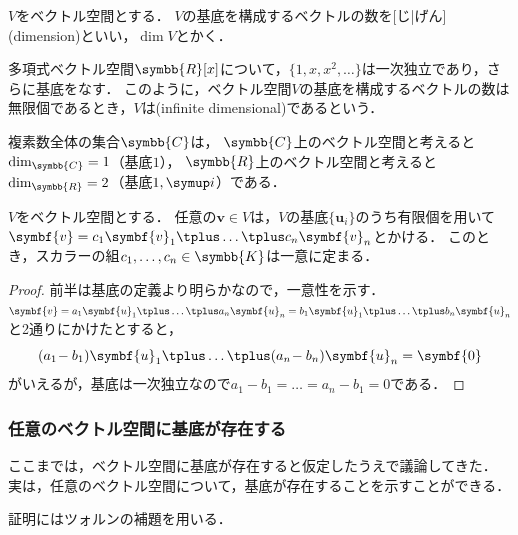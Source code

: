 \documentclass[../sotsu.tex]{subfiles}
\begin{document}
\begin{definition}[次元]
    \label{dfn:dimension}
    $V$をベクトル空間とする．
    $V$の基底を構成するベクトルの数を[じ|げん](dimension)といい，$\dim V$とかく．
\end{definition}

\begin{example}
    多項式ベクトル空間$\symbb{R}[x]$について，$\{ 1, x, x^2, \dotsc \}$は一次独立であり，さらに基底をなす．
    このように，ベクトル空間$V$の基底を構成するベクトルの数は無限個であるとき，$V$は(infinite dimensional)であるという．
\end{example}

\begin{example}
    複素数全体の集合$\symbb{C}$は，
    $\symbb{C}$上のベクトル空間と考えると$\dim_{\symbb{C}} = 1$（基底$1$），
    $\symbb{R}$上のベクトル空間と考えると$\dim_{\symbb{R}} = 2$（基底$1, \iu$）である．
\end{example}


\begin{corollary}[基底によるベクトルの展開]
    \label{thm:coordinates-by-basis}
    $V$をベクトル空間とする．
    任意の$\symbf{v} \in V$は，$V$の基底$ \{ \symbf{u}_i \} $のうち有限個を用いて$\symbf{v} = c_1 \symbf{v}_1 \vecplus \dots \vecplus c_n \symbf{v}_n$とかける．
    このとき，スカラーの組$c_1, \dots, c_n \in \symbb{K}$は一意に定まる．
\end{corollary}

\begin{proof}
    前半は基底の定義より明らかなので，一意性を示す．
    $\symbf{v} = a_1 \symbf{u}_1 \vecplus \dots \vecplus a_n \symbf{u}_n = b_1 \symbf{u}_1 \vecplus \dots \vecplus b_n \symbf{u}_n$と2通りにかけたとすると，
    \begin{equation*}
        (a_1 \! - b_1) \symbf{u}_1 \vecplus \dots \vecplus (a_n \! - b_n) \symbf{u}_n = \symbf{0}
    \end{equation*}
    がいえるが，基底は一次独立なので$a_1 \! - b_1 = \dots = a_n \! - b_1 = 0$である．
\end{proof}



\subsubsection{任意のベクトル空間に基底が存在する}

ここまでは，ベクトル空間に基底が存在すると仮定したうえで議論してきた．
実は，任意のベクトル空間について，基底が存在することを示すことができる．

証明にはツォルンの補題を用いる．
\end{document}
